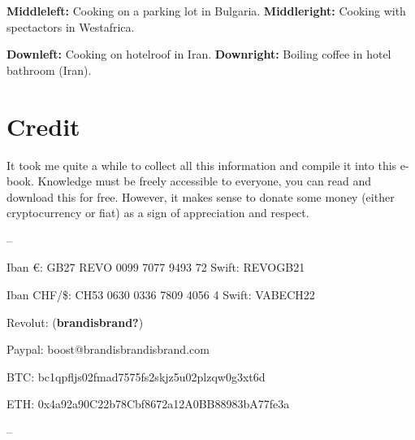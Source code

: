 \documentclass[
]{article}
\begin{document}
\textbf{Middleleft:} Cooking on a parking lot in Bulgaria.
\textbf{Middleright:} Cooking with spectactors in Westafrica.

\textbf{Downleft:} Cooking on hotelroof in Iran. \textbf{Downright:}
Boiling coffee in hotel bathroom (Iran). \newpage

\section{Credit}\label{credit}

It took me quite a while to collect all this information and compile it
into this e-book. Knowledge must be freely accessible to everyone, you
can read and download this for free. However, it makes sense to donate
some money (either cryptocurrency or fiat) as a sign of appreciation and
respect.

--

Iban €: GB27 REVO 0099 7077 9493 72 Swift: REVOGB21

Iban CHF/\$: CH53 0630 0336 7809 4056 4 Swift: VABECH22

Revolut: (\textbf{brandisbrand?})

Paypal: boost@brandisbrandisbrand.com

BTC: bc1qpfljs02fmad7575fs2skjz5u02plzqw0g3xt6d

ETH: 0x4a92a90C22b78Cbf8672a12A0BB88983bA77fe3a

--
\end{document}
